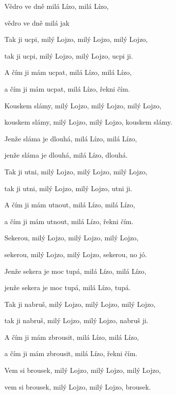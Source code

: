 







\zs
Vědro  ve dně  milá Lízo, milá Lízo,

vědro  ve dně  milá  jak 
\ks

\zs
Tak ji ucpi, milý Lojzo, milý Lojzo, milý Lojzo,

tak ji ucpi, milý Lojzo, milý Lojzo, ucpi ji.
\ks

\zs
A čím ji mám ucpat, milá Lízo, milá Lízo,

a čím ji mám ucpat, milá Lízo, řekni čím.
\ks

\zs
Kouskem slámy, milý Lojzo, milý Lojzo, milý Lojzo,

kouskem slámy, milý Lojzo, milý Lojzo, kouskem slámy.
\ks

\zs
Jenže sláma je dlouhá, milá Lízo, milá Lízo,

jenže sláma je dlouhá, milá Lízo, dlouhá.
\ks

\zs
Tak ji utni, milý Lojzo, milý Lojzo, milý Lojzo,

tak ji utni, milý Lojzo, milý Lojzo, utni ji.
\ks

\zs
A čím ji mám utnout, milá Lízo, milá Lízo,

a čím ji mám utnout, milá Lízo, řekni čím.
\ks

\zs
Sekerou, milý Lojzo, milý Lojzo, milý Lojzo,

sekerou, milý Lojzo, milý Lojzo, sekerou, no jó.
\ks

\zs
Jenže sekera je moc tupá, milá Lízo, milá Lízo,

jenže sekera je moc tupá, milá Lízo, tupá.
\ks

\zs
Tak ji nabruš, milý Lojzo, milý Lojzo, milý Lojzo,

tak ji nabruš, milý Lojzo, milý Lojzo, nabruš ji.
\ks

\zs
A čím ji mám zbrousit, milá Lízo, milá Lízo,

a čím ji mám zbrousit, milá Lízo, řekni čím.
\ks

\zs
Vem si brousek, milý Lojzo, milý Lojzo, milý Lojzo,

vem si brousek, milý Lojzo, milý Lojzo, brousek.
\ks

